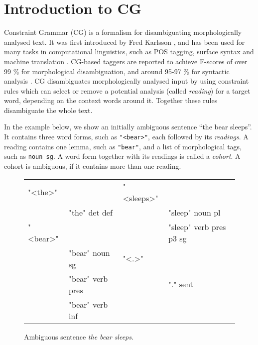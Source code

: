 \def\t#1{\texttt{#1}}

\section{Introduction to CG}
\label{sec:cg-intro}
 

Constraint Grammar (CG) is a formalism for 
disambiguating morphologically analysed text. 
It was first introduced by Fred Karlsson  
\cite{karlsson1990cgp,karlsson1995constraint}, and has been used for many tasks in
computational linguistics, such as POS tagging, surface syntax and
machine translation \cite{bick2011}.
CG-based taggers are reported to achieve F-scores of over 99 \% for morphological disambiguation, 
and around 95-97 \% for syntactic analysis \cite{bick2000palavras,bick2003hybridCG_PSG,bick2006spanish}.
CG disambiguates morphologically analysed input by using
constraint rules which can select or remove a potential analysis (called \emph{reading})
for a target word, depending on the context words around it. 
Together these rules disambiguate the whole text.


In the example below, we show an initially ambiguous sentence ``the bear
sleeps''. 
It contains three word forms, such as \t{"<bear>"}, each followed by its \emph{readings}.
A reading contains one lemma, such as \t{"bear"}, and a list of morphological tags, such as \t{noun sg}.
A word form together with its readings is called a \emph{cohort}. A cohort is ambiguous, if it contains more than one reading.

\begin{figure}[h]
\centering
\ttfamily
\begin{tabular}{p{0.6cm} l  p{0.6cm} l}
"<the>"  &                & "<sleeps>"        \\
    & "the" det def       &     & "sleep" noun pl \\
"<bear>" &                &     & "sleep" verb pres p3 sg \\
    & "bear" noun sg      & "<.>"                   \\
    & "bear" verb pres    &     & "." sent          \\
    & "bear" verb inf \\
\end{tabular}
\label{fig:theBearSleeps}
\caption{Ambiguous sentence {\em the bear sleeps.}}
\end{figure}



